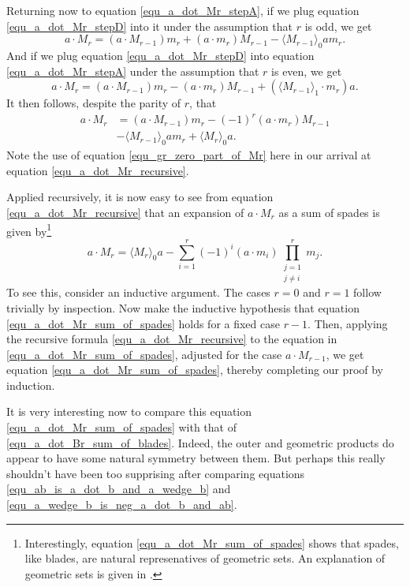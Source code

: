 \documentclass{birkjour}
\theoremstyle{definition}
\theoremstyle{remark}
\numberwithin{equation}{section}
\begin{document}
Returning now to equation \eqref{equ_a_dot_Mr_stepA}, if we plug equation \eqref{equ_a_dot_Mr_stepD} into it
under the assumption that $r$ is odd, we get
\begin{equation}
a\cdot M_r = (a\cdot M_{r-1})m_r + (a\cdot m_r)M_{r-1} - \langle M_{r-1}\rangle_0am_r.
\end{equation}
And if we plug equation \eqref{equ_a_dot_Mr_stepD} into equation \eqref{equ_a_dot_Mr_stepA} under the assumption
that $r$ is even, we get
\begin{equation}
a\cdot M_r = (a\cdot M_{r-1})m_r - (a\cdot m_r)M_{r-1} + (\langle M_{r-1}\rangle_1\cdot m_r)a.
\end{equation}
It then follows, despite the parity of $r$, that
\begin{align}
a\cdot M_r &= (a\cdot M_{r-1})m_r - (-1)^r(a\cdot m_r)M_{r-1}\nonumber \\
 &- \langle M_{r-1}\rangle_0am_r + \langle M_r\rangle_0a.\label{equ_a_dot_Mr_recursive}
\end{align}
Note the use of equation \eqref{equ_gr_zero_part_of_Mr} here in our arrival at equation \eqref{equ_a_dot_Mr_recursive}.

Applied recursively, it is now easy to see from equation \eqref{equ_a_dot_Mr_recursive} that an expansion of
$a\cdot M_r$ as a sum of spades is given by\footnote{Interestingly, equation \eqref{equ_a_dot_Mr_sum_of_spades} shows
that spades, like blades, are natural represenatives of geometric sets.  An explanation of geometric sets is given in \cite{}.}
\begin{equation}\label{equ_a_dot_Mr_sum_of_spades}
a\cdot M_r = \langle M_r\rangle_0a - \sum_{i=1}^r(-1)^i(a\cdot m_i)\prod_{\substack{j=1\\j\neq i}}^rm_j.
\end{equation}
To see this, consider an inductive argument.  The cases $r=0$ and $r=1$ follow trivially by inspection.
Now make the inductive hypothesis that equation \eqref{equ_a_dot_Mr_sum_of_spades} holds for a fixed case $r-1$.
Then, applying the recursive formula \eqref{equ_a_dot_Mr_recursive} to the equation in \eqref{equ_a_dot_Mr_sum_of_spades},
adjusted for the case $a\cdot M_{r-1}$, we get equation \eqref{equ_a_dot_Mr_sum_of_spades}, thereby completing
our proof by induction.

It is very interesting now to compare this equation \eqref{equ_a_dot_Mr_sum_of_spades} with that of \eqref{equ_a_dot_Br_sum_of_blades}.
Indeed, the outer and geometric products do appear to have some natural symmetry between them.  But perhaps this really shouldn't have been
too supprising after comparing equations \eqref{equ_ab_is_a_dot_b_and_a_wedge_b} and \eqref{equ_a_wedge_b_is_neg_a_dot_b_and_ab}.
\end{document}
